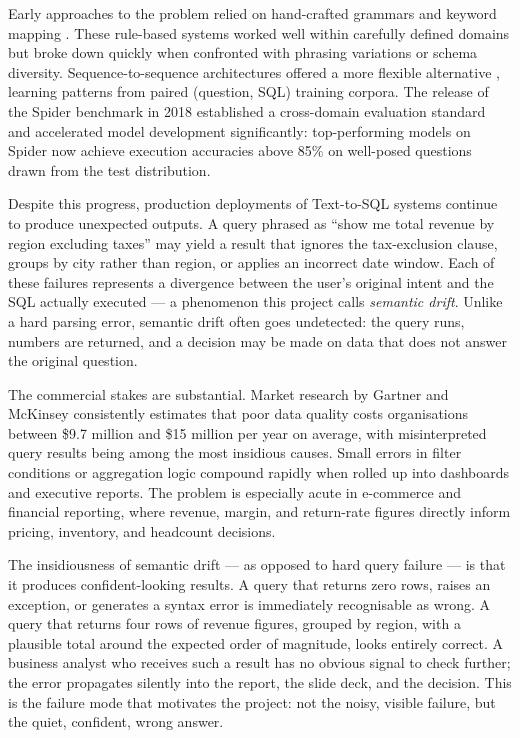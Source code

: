 \documentclass[12pt,a4paper]{report}
\begin{document}
Early approaches to the problem relied on hand-crafted grammars and keyword mapping \cite{seq2sql}. These rule-based systems worked well within carefully defined domains but broke down quickly when confronted with phrasing variations or schema diversity. Sequence-to-sequence architectures offered a more flexible alternative \cite{sqlnet}, learning patterns from paired (question, SQL) training corpora. The release of the Spider benchmark in 2018 \cite{spider} established a cross-domain evaluation standard and accelerated model development significantly: top-performing models on Spider now achieve execution accuracies above 85\% on well-posed questions drawn from the test distribution.

Despite this progress, production deployments of Text-to-SQL systems continue to produce unexpected outputs. A query phrased as ``show me total revenue by region excluding taxes'' may yield a result that ignores the tax-exclusion clause, groups by city rather than region, or applies an incorrect date window. Each of these failures represents a divergence between the user's original intent and the SQL actually executed — a phenomenon this project calls \textit{semantic drift}. Unlike a hard parsing error, semantic drift often goes undetected: the query runs, numbers are returned, and a decision may be made on data that does not answer the original question.

The commercial stakes are substantial. Market research by Gartner and McKinsey consistently estimates that poor data quality costs organisations between \$9.7 million and \$15 million per year on average, with misinterpreted query results being among the most insidious causes. Small errors in filter conditions or aggregation logic compound rapidly when rolled up into dashboards and executive reports. The problem is especially acute in e-commerce and financial reporting, where revenue, margin, and return-rate figures directly inform pricing, inventory, and headcount decisions.

The insidiousness of semantic drift — as opposed to hard query failure — is that it produces confident-looking results. A query that returns zero rows, raises an exception, or generates a syntax error is immediately recognisable as wrong. A query that returns four rows of revenue figures, grouped by region, with a plausible total around the expected order of magnitude, looks entirely correct. A business analyst who receives such a result has no obvious signal to check further; the error propagates silently into the report, the slide deck, and the decision. This is the failure mode that motivates the project: not the noisy, visible failure, but the quiet, confident, wrong answer.
\end{document}
